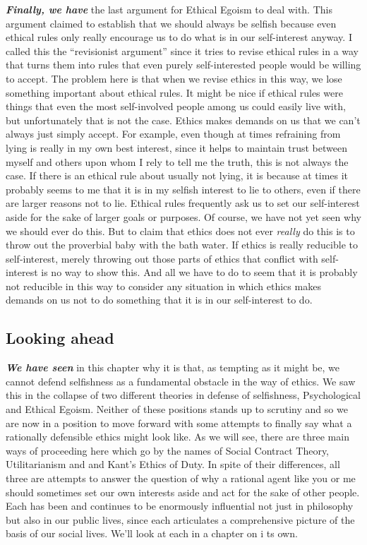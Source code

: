 \documentclass[12pt, openany]{book}
\begin{document}
\textbf{\emph{Finally, we have}} the last argument for Ethical Egoism to deal with. This argument claimed to establish that we should always be selfish because even ethical rules only really encourage us to do what is in our self-interest anyway. I called this the ``revisionist argument'' since it tries to revise ethical rules in a way that turns them into rules that even purely self-interested people would be willing to accept. The problem here is that when we revise ethics in this way, we lose something important about ethical rules. It might be nice if ethical rules were things that even the most self-involved people among us could easily live with, but unfortunately that is not the case. Ethics makes demands on us that we can't always just simply accept. For example, even though at times refraining from lying is really in my own best interest, since it helps to maintain trust between myself and others upon whom I rely to tell me the truth, this is not always the case. If there is an ethical rule about usually not lying, it is because at times it probably seems to me that it is in my selfish interest to lie to others, even if there are larger reasons not to lie. Ethical rules frequently ask us to set our self-interest aside for the sake of larger goals or purposes. Of course, we have not yet seen why we should ever do this. But to claim that ethics does not ever \emph{really} do this is to throw out the proverbial baby with the bath water. If ethics is really reducible to self-interest, merely throwing out those parts of ethics that conflict with self-interest is no way to show this. And all we have to do to seem that it is probably not reducible in this way to consider any situation in which ethics makes demands on us not to do something that it is in our self-interest to do.

\hypertarget{looking-ahead}{%
\subsection*{Looking ahead}\label{looking-ahead}}


\textbf{\emph{We have seen}} in this chapter why it is that, as tempting as it might be, we cannot defend selfishness as a fundamental obstacle in the way of ethics. We saw this in the collapse of two different theories in defense of selfishness, Psychological and Ethical Egoism. Neither of these positions stands up to scrutiny and so we are now in a position to move forward with some attempts to finally say what a rationally defensible ethics might look like. As we will see, there are three main ways of proceeding here which go by the names of Social Contract Theory, Utilitarianism and and Kant's Ethics of Duty. In spite of their differences, all three are attempts to answer the question of why a rational agent like you or me should sometimes set our own interests aside and act for the sake of other people. Each has been and continues to be enormously influential not just in philosophy but also in our public lives, since each articulates a comprehensive picture of the basis of our social lives. We'll look at each in a chapter on i ts own.
\end{document}
